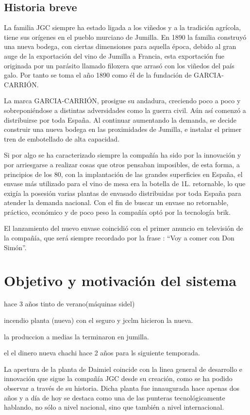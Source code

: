 \documentclass[11pt,a4paper,spanish,twoside]{report}
\begin{document}
\section{Historia breve}
La familia JGC siempre ha estado ligada a los viñedos y a la tradición
agrícola, tiene sus orígenes en el pueblo murciano de Jumilla. En 1890 la 
familia construyó una nueva bodega, con ciertas dimensiones para aquella
época, debido al gran auge de la exportación del vino de Jumilla a
Francia, esta exportación fue originada por un parásito llamado filoxera que
arrasó con los viñedos del país galo. Por tanto se toma el año 1890 como él de la
fundación de GARCIA-CARRIÓN.

La marca GARCIA-CARRIÓN, prosigue su andadura, creciendo poco a poco y
sobreponiéndose a distintas adversidades como la guerra civil. Aún así
comenzó a distribuirse por toda España. Al continuar aumentando la demanda, 
se decide construir una nueva bodega en las proximidades de Jumilla, e
instalar el primer tren de embotellado de alta capacidad.
  
 
Si por algo se ha caracterizado siempre la compañía ha sido por la innovación
y por arriesgarse a realizar cosas que otros pensaban imposibles, de
esta forma, a principios de los 80, con la implantación de las grandes
superficies en España, el envase más utilizado para el vino de mesa era la
botella de 1L. retornable, lo que exigía la posesión varias plantas de
envasado distribuidas por toda España para atender la demanda nacional. Con
el fin de buscar un envase no retornable, práctico, económico y de poco peso
la compañía optó por la tecnología brik.

El lanzamiento del nuevo envase coincidió con el primer anuncio en televisión
de la compañía, que será siempre recordado por la frase : ``Voy a comer con
Don Simón''.

\chapter{Objetivo y motivación del sistema}
hace 3 años tinto de verano(máquinas sidel)

incendio planta (nueva) con el seguro y jcclm hicieron la nueva.

la produccion a medias la terminaron en jumilla.

el el dinero nueva chachi hace 2 años para ls siguiente temporada.



La apertura de la planta de Daimiel coincide con la linea general de
desarrollo e innovación que sigue la compañía JGC desde su creación, como
se ha podido observar a través de su historia. Dicha planta fue innaugurada
hace apenas dos años y a día de hoy se destaca como una de las punteras
tecnológicamente hablando, no sólo a nivel nacional, sino que también a nivel
internacional.
\end{document}
